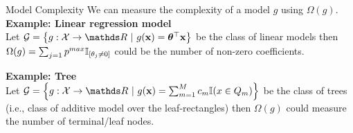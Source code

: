 \documentclass[11pt,compress,t,notes=noshow, xcolor=table]{beamer}
\newcommand{\Gspace}{\mathcal{G}}
\begin{document}
\begin{vbframe}{Model Complexity}
We can measure the complexity of a model $g$ using $\Omega(g)$. \\ 
\vspace{0.5cm}
 	\textbf{Example: Linear regression model}\\
 	Let $\Gspace = \left\{g: \Xspace \to \R ~|~g(\xv) = \thetab^\top \xv\right\}$ be the class of linear models then $\Omega(g) = \sum_{j = 1}{p}^{max}\I_{[\theta_j \neq 0]}$ could be the number of non-zero coefficients. 
 	\vspace{0.5cm}
 	
 	\textbf{Example: Tree}\\
 	Let $\Gspace = \left\{g:\Xspace \to \R ~|~g(\xv) = \sum_{m=1}^M c_m \I(x \in Q_m)\right\}$ be the class of trees (i.e., class of additive model over the leaf-rectangles) then $\Omega(g)$ could measure the number of terminal/leaf nodes.\\
 	\end{vbframe}
 
\end{document}
